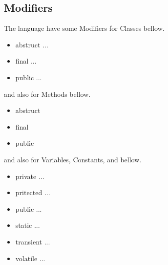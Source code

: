 \documentclass{jarticle}
\begin{document}
\subsection{Modifiers}
 The language have some Modifiers for Classes bellow.
 \begin{itemize}
  \item abstruct ...
  \item final ...
  \item public ...
\end{itemize}
 and also for Methods bellow.
\begin{itemize}
 \item abstruct
 \item final
 \item public
\end{itemize}
 and also for Variables, Constants, and  bellow.
\begin{itemize}
 \item private ...
 \item pritected ...
 \item public ...
 \item static ...
 \item transient ...
 \item volatile ...
\end{itemize}
\end{document}
